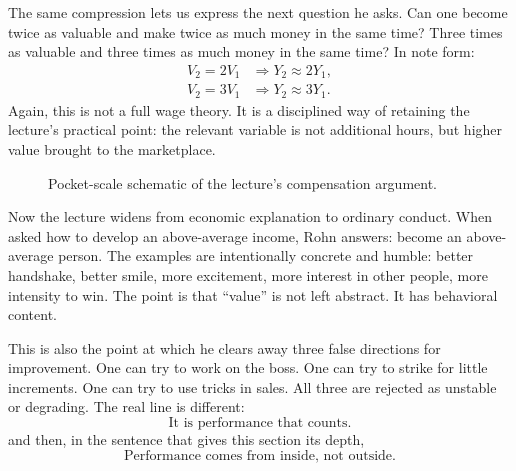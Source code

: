 The same compression lets us express the next question he asks. Can one become twice as valuable and make twice as much money in the same time? Three times as valuable and three times as much money in the same time? In note form:
\begin{align}
V_2 = 2V_1 &\Rightarrow Y_2 \approx 2Y_1,\\
V_2 = 3V_1 &\Rightarrow Y_2 \approx 3Y_1.
\end{align}
Again, this is not a full wage theory. It is a disciplined way of retaining the lecture's practical point: the relevant variable is not additional hours, but higher value brought to the marketplace.

\begin{figure}[t]
\centering
{}
\caption{Pocket-scale schematic of the lecture's compensation argument.}
\end{figure}

Now the lecture widens from economic explanation to ordinary conduct. When asked how to develop an above-average income, Rohn answers: become an above-average person. The examples are intentionally concrete and humble: better handshake, better smile, more excitement, more interest in other people, more intensity to win. The point is that ``value'' is not left abstract. It has behavioral content.

This is also the point at which he clears away three false directions for improvement. One can try to work on the boss. One can try to strike for little increments. One can try to use tricks in sales. All three are rejected as unstable or degrading. The real line is different:
\begin{equation}
\text{It is performance that counts.}
\end{equation}
and then, in the sentence that gives this section its depth,
\begin{equation}
\text{Performance comes from inside, not outside.}
\end{equation}

